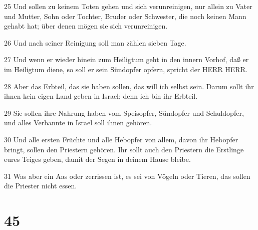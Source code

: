 \par 25 Und sollen zu keinem Toten gehen und sich verunreinigen, nur allein zu Vater und Mutter, Sohn oder Tochter, Bruder oder Schwester, die noch keinen Mann gehabt hat; über denen mögen sie sich verunreinigen.
\par 26 Und nach seiner Reinigung soll man zählen sieben Tage.
\par 27 Und wenn er wieder hinein zum Heiligtum geht in den innern Vorhof, daß er im Heiligtum diene, so soll er sein Sündopfer opfern, spricht der HERR HERR.
\par 28 Aber das Erbteil, das sie haben sollen, das will ich selbst sein. Darum sollt ihr ihnen kein eigen Land geben in Israel; denn ich bin ihr Erbteil.
\par 29 Sie sollen ihre Nahrung haben vom Speisopfer, Sündopfer und Schuldopfer, und alles Verbannte in Israel soll ihnen gehören.
\par 30 Und alle ersten Früchte und alle Hebopfer von allem, davon ihr Hebopfer bringt, sollen den Priestern gehören. Ihr sollt auch den Priestern die Erstlinge eures Teiges geben, damit der Segen in deinem Hause bleibe.
\par 31 Was aber ein Aas oder zerrissen ist, es sei von Vögeln oder Tieren, das sollen die Priester nicht essen.

\chapter{45}

